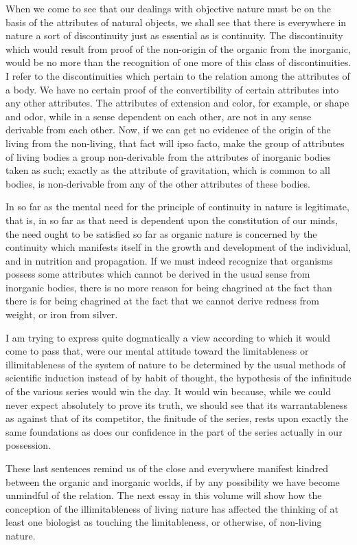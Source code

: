 \documentclass[a4paper, 11pt, oneside, polutonikogreek, english]{article}
\begin{document}
When we come to see that our dealings with objective nature must be on the basis of the attributes of natural objects, we shall see that there is everywhere in nature a sort of discontinuity just as essential as is continuity. The discontinuity which would result from proof of the non-origin of the organic from the inorganic, would be no more than the recognition of one more of this class of discontinuities. I refer to the discontinuities which pertain to the relation among the attributes of a body. We have no certain proof of the convertibility of certain attributes into any other attributes. The attributes of extension and color, for example, or shape and odor, while in a sense dependent on each other, are not in any sense derivable from each other. Now, if we can get no evidence of the origin of the living from the non-living, that fact will ipso facto, make the group of attributes of living bodies a group non-derivable from the attributes of inorganic bodies taken as such; exactly as the attribute of gravitation, which is common to all bodies, is non-derivable from any of the other attributes of these bodies.

In so far as the mental need for the principle of continuity in nature is legitimate, that is, in so far as that need is dependent upon the constitution of our minds, the need ought to be satisfied so far as organic nature is concerned by the continuity which manifests itself in the growth and development of the individual, and in nutrition and propagation. If we must indeed recognize that organisms possess some attributes which cannot be derived in the usual sense from inorganic bodies, there is no more reason for being chagrined at the fact than there is for being chagrined at the fact that we cannot derive redness from weight, or iron from silver.

I am trying to express quite dogmatically a view according to which it would come to pass that, were our mental attitude toward the limitableness or illimitableness of the system of nature to be determined by the usual methods of scientific induction instead of by habit of thought, the hypothesis of the infinitude of the various series would win the day. It would win because, while we could never expect absolutely to prove its truth, we should see that its warrantableness as against that of its competitor, the finitude of the series, rests upon exactly the same foundations as does our confidence in the part of the series actually in our possession.

These last sentences remind us of the close and everywhere manifest kindred between the organic and inorganic worlds, if by any possibility we have become unmindful of the relation. The next essay in this volume will show how the conception of the illimitableness of living nature has affected the thinking of at least one biologist as touching the limitableness, or otherwise, of non-living nature.
\clearpage
\end{document}

